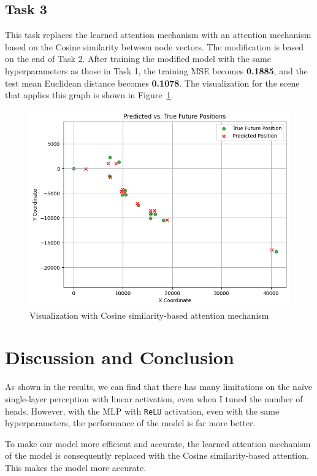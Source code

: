 \documentclass[conference]{IEEEtran}
\begin{document}
\subsection*{Task 3}

This task replaces the learned attention mechanism with an attention mechanism
based on the Cosine similarity between node vectors. The modification is based
on the end of Task 2. After training the modified model with the same
hyperparameters as those in Task 1, the training MSE becomes \textbf{0.1885},
and the test mean Euclidean distance becomes \textbf{0.1078}. The visualization
for the scene that applies this graph is shown in Figure~\ref{fig:visual3}.

\begin{figure}[htbp]
    \centering
    \includegraphics[width=0.8\linewidth]{figvisual3.png}
    \caption{Visualization with Cosine similarity-based attention mechanism}
    \label{fig:visual3}
\end{figure}

\section{Discussion and Conclusion}

As shown in the results, we can find that there has many limitations on the
naïve single-layer perception with linear activation, even when I tuned the
number of heads. However, with the MLP with \texttt{ReLU} activation, even with
the same hyperparameters, the performance of the model is far more better.



To make our model more efficient and accurate, the learned attention mechanism
of the model is consequently replaced with the Cosine similarity-based
attention. This makes the model more accurate.
\end{document}
